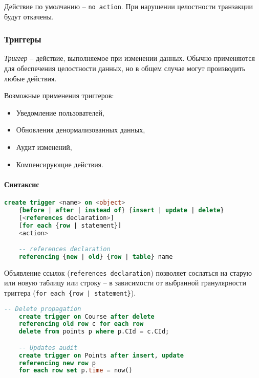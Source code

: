 \begin{remark}
	Действие по умолчанию -- \texttt{no action}. При нарушении целостности транзакции будут
	откачены.
\end{remark}

\subsubsection{Триггеры}

\begin{definition}
	\textit{Триггер} -- действие, выполняемое при изменении данных. Обычно применяются для
	обеспечения целостности данных, но в общем случае могут производить любые действия.
\end{definition}

Возможные применения триггеров:

\begin{itemize}
	\item Уведомление пользователей,
	\item Обновления денормализованных данных,
	\item Аудит изменений,
	\item Компенсирующие действия.
\end{itemize}

\paragraph{Синтаксис}
\enewline

\begin{lstlisting}[language=SQL]
    create trigger <name> on <object>
    {before | after | instead of} {insert | update | delete}
    [<references declaration>]
    [for each {row | statement}]
    <action>

    -- references declaration
    referencing {new | old} {row | table} name
\end{lstlisting}

Объявление ссылок (\texttt{references declaration}) позволяет сослаться на старую или новую таблицу или
строку -- в зависимости от выбранной гранулярности триггера (\texttt{for each \{row | statement\}}).

\begin{examples}
	\enewline
	\begin{lstlisting}[language=SQL]
    -- Delete propagation
    create trigger on Course after delete
    referencing old row c for each row
    delete from points p where p.CId = c.CId;

    -- Updates audit
    create trigger on Points after insert, update
    referencing new row p
    for each row set p.time = now()
    \end{lstlisting}
\end{examples}
